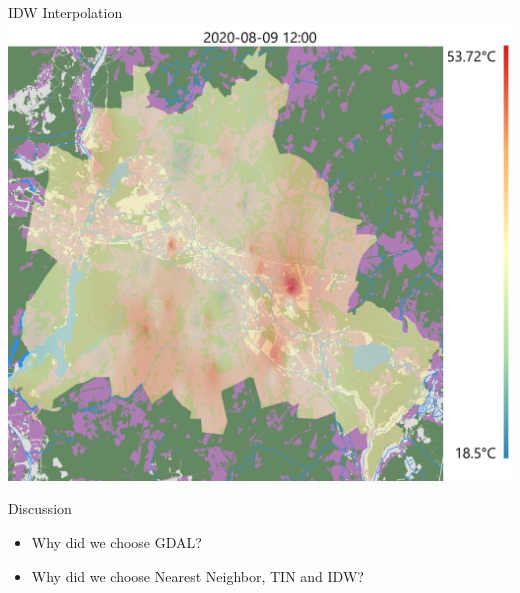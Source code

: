 \begin{frame}{IDW Interpolation}
	\centering
	\includegraphics[height=\textheight,keepaspectratio]{../writeup/images/hot_2020-08-09_12_00_invdistnn.png}
\end{frame}
\begin{frame}{Discussion}
	\begin{itemize}
		\item Why did we choose GDAL?
		\item Why did we choose Nearest Neighbor, TIN and IDW?
	\end{itemize}
\end{frame}